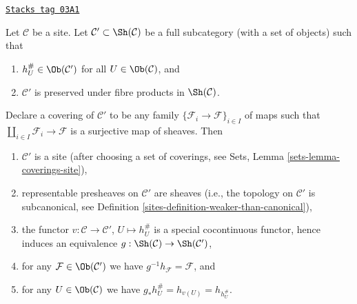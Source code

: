 \begin{lemma}
\label{sites-lemma-special-equivalence}
\href{https://stacks.math.columbia.edu/tag/03A1}{\texttt{Stacks tag 03A1}}

Let $\mathcal{C}$ be a site. Let
$\mathcal{C}' \subset \Sh(\mathcal{C})$
be a full subcategory (with a set of objects) such that
\begin{enumerate}
\item $h_U^\# \in \Ob(\mathcal{C}')$ for all
$U \in \Ob(\mathcal{C})$, and
\item $\mathcal{C}'$ is preserved under fibre products in
$\Sh(\mathcal{C})$.
\end{enumerate}
Declare a covering of $\mathcal{C}'$ to be any family
$\{\mathcal{F}_i \to \mathcal{F}\}_{i \in I}$ of maps such that
$\coprod_{i \in I} \mathcal{F}_i \to \mathcal{F}$ is a surjective
map of sheaves. Then
\begin{enumerate}
\item $\mathcal{C}'$ is a site (after
choosing a set of coverings, see Sets, Lemma \ref{sets-lemma-coverings-site}),
\item representable presheaves on $\mathcal{C}'$ are sheaves
(i.e., the topology on $\mathcal{C}'$ is subcanonical, see
Definition \ref{sites-definition-weaker-than-canonical}),
\item the functor $v : \mathcal{C} \to \mathcal{C}'$,
$U \mapsto h_U^\#$ is a special cocontinuous functor, hence induces an
equivalence $g : \Sh(\mathcal{C}) \to \Sh(\mathcal{C}')$,
\item for any $\mathcal{F} \in \Ob(\mathcal{C}')$ we have
$g^{-1}h_\mathcal{F} = \mathcal{F}$, and
\item for any $U \in \Ob(\mathcal{C})$ we have
$g_*h_U^\# = h_{v(U)} = h_{h_U^\#}$.
\end{enumerate}
\end{lemma}


